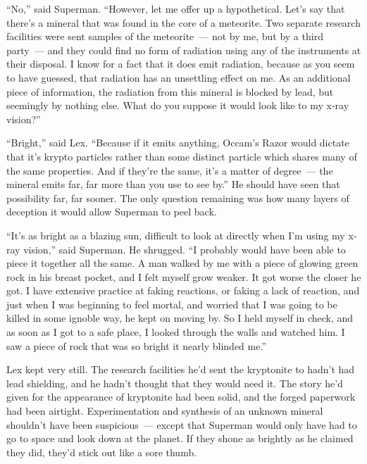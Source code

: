 \documentclass[ebook,12pt]{memoir}
\begin{document}
``No,'' said Superman. ``However, let me offer up a hypothetical. Let's
say that there's a mineral that was found in the core of a meteorite.
Two separate research facilities were sent samples of the meteorite~---
not by me, but by a third party~--- and they could find no form of
radiation using any of the instruments at their disposal. I know for a
fact that it does emit radiation, because as you seem to have guessed,
that radiation has an unsettling effect on me. As an additional piece of
information, the radiation from this mineral is blocked by lead, but
seemingly by nothing else. What do you suppose it would look like to my
x‐ray vision?''

``Bright,'' said Lex. ``Because if it emits anything, Occam's Razor
would dictate that it's krypto particles rather than some distinct
particle which shares many of the same properties. And if they're the
same, it's a matter of degree~--- the mineral emits far, far more than
you use to see by.'' He should have seen that possibility far, far
sooner. The only question remaining was how many layers of deception it
would allow Superman to peel back.

``It's as bright as a blazing sun, difficult to look at directly when
I'm using my x‐ray vision,'' said Superman. He shrugged. ``I probably
would have been able to piece it together all the same. A man walked by
me with a piece of glowing green rock in his breast pocket, and I felt
myself grow weaker. It got worse the closer he got. I have extensive
practice at faking reactions, or faking a lack of reaction, and just
when I was beginning to feel mortal, and worried that I was going to be
killed in some ignoble way, he kept on moving by. So I held myself in
check, and as soon as I got to a safe place, I looked through the walls
and watched him. I saw a piece of rock that was so bright it nearly
blinded me.''

Lex kept very still. The research facilities he'd sent the kryptonite to
hadn't had lead shielding, and he hadn't thought that they would need
it. The story he'd given for the appearance of kryptonite had been
solid, and the forged paperwork had been airtight. Experimentation and
synthesis of an unknown mineral shouldn't have been suspicious~---
except that Superman would only have had to go to space and look down at
the planet. If they shone as brightly as he claimed they did, they'd
stick out like a sore thumb.
\end{document}
